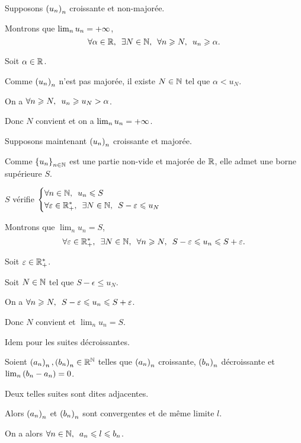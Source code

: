 \begin{dem}
Supposons \(\left(u_n\right)_n\) croissante et non-majorée.

Montrons que \(\lim_nu_n=+\infty\), \cad \[\quantifs{\forall\alpha\in\R;\exists N\in\N;\forall n\geq N}u_n\geq\alpha.\]

Soit \(\alpha\in\mathbb{R}\).

Comme \(\left(u_n\right)_n\) n'est pas majorée, il existe \(N\in\mathbb{N}\) tel que \(\alpha<u_N\).

On a \(\quantifs{\forall n\geq N}u_n\geq u_N>\alpha\).

Donc \(N\) convient et on a \(\lim_nu_n=+\infty\).

Supposons maintenant \(\left(u_n\right)_n\) croissante et majorée.

Comme \(\left\lbrace u_n\right\rbrace_{n\in\mathbb{N}}\) est une partie non-vide et majorée de \(\mathbb{R}\), elle admet une borne supérieure \(S\).

\(S\) vérifie \(\begin{dcases}\quantifs{\forall n\in\N}u_n\leq S \\ \quantifs{\forall\epsilon\in\Rps;\exists N\in\N}S-\epsilon\leq u_N\end{dcases}\)

Montrons que \(\lim_nu_n=S\), \cad \[\quantifs{\forall\epsilon\in\Rps;\exists N\in\N;\forall n\geq N}S-\epsilon\leq u_n\leq S+\epsilon.\]

Soit \(\varepsilon\in\mathbb{R}_+^*\).

Soit \(N\in\mathbb{N}\) tel que \(S-\epsilon\leq u_N\).

On a \(\quantifs{\forall n\geq N}S-\epsilon\leq u_n\leq S+\epsilon\).

Donc \(N\) convient et \(\lim_nu_n=S\).

Idem pour les suites décroissantes.
\end{dem}

\begin{theo}
Soient \(\left(a_n\right)_n,\left(b_n\right)_n\in\mathbb{R}^{\mathbb{N}}\) telles que \(\left(a_n\right)_n\) croissante, \(\left(b_n\right)_n\) décroissante et \(\lim_n\left(b_n-a_n\right)=0\).

Deux telles suites sont dites adjacentes.

Alors \(\left(a_n\right)_n\) et \(\left(b_n\right)_n\) sont convergentes et de même limite \(l\).

On a alors \(\quantifs{\forall n\in\N}a_n\leq l\leq b_n\).
\end{theo}

